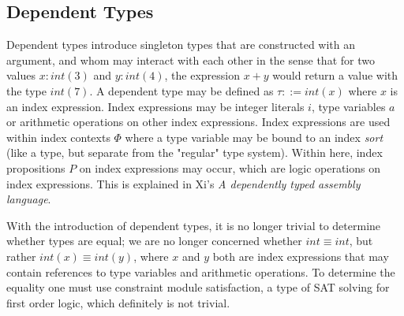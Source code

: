 
\subsection{Dependent Types}
Dependent types introduce singleton types that are constructed with an
argument, and whom may interact with each other in the sense that for two
values $x \colon int(3)$ and $y \colon int(4)$, the expression $x + y$ would
return a value with the type $int(7)$. A dependent type may be
defined as $\tau ::= int(x)$\cite{xi-dtal} where $x$ is an index expression.
Index expressions may be integer literals $i$, type variables $a$ or arithmetic
operations on other index expressions.
Index expressions are used within index contexts $\Phi$ where a type variable
may be bound to an index \textit{sort} (like a type, but separate from the
"regular" type system). Within here, index propositions $P$ on index
expressions may occur, which are logic operations on index expressions.
This is explained in Xi's \textit{A dependently typed assembly language}.

With the introduction of dependent types, it is no longer trivial to determine
whether types are equal; we are no longer concerned whether $int \equiv int$,
but rather $int(x) \equiv int(y)$, where $x$ and $y$ both are index expressions
that may contain references to type variables and arithmetic operations.
To determine the equality one must use constraint module
satisfaction\cite{xi-dtal}, a type of SAT solving for first order logic, which
definitely is not trivial\cite{lics}.

